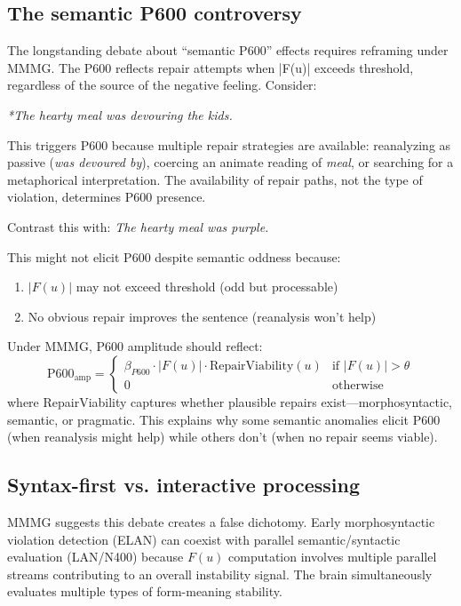 \documentclass[12pt,letterpaper]{article}
\begin{document}
\subsection{The semantic P600 controversy}
The longstanding debate about \enquote{semantic P600} effects \autocite{Kuperberg2007} requires reframing under MMMG. The P600 reflects repair attempts when |F(u)| exceeds threshold, regardless of the source of the negative feeling. Consider:

\ea
\textit{*The hearty meal was devouring the kids.}
\z

This triggers P600 because multiple repair strategies are available: reanalyzing as passive (\textit{was devoured by}), coercing an animate reading of \textit{meal}, or searching for a metaphorical interpretation. The availability of repair paths, not the type of violation, determines P600 presence.

Contrast this with:
\ea
\textit{The hearty meal was purple.}
\z

This might not elicit P600 despite semantic oddness because:
\begin{enumerate}
    \item $|F(u)|$ may not exceed threshold (odd but processable)
    \item No obvious repair improves the sentence (reanalysis won't help)
\end{enumerate}

Under MMMG, P600 amplitude should reflect:
\[
\text{P600}_{\text{amp}} = \begin{cases}
\beta_{P600} \cdot |F(u)| \cdot \text{RepairViability}(u) & \text{if } |F(u)| > \theta \\
0 & \text{otherwise}
\end{cases}
\]
where RepairViability captures whether plausible repairs exist—morphosyntactic, semantic, or pragmatic. This explains why some semantic anomalies elicit P600 (when reanalysis might help) while others don't (when no repair seems viable).

\subsection{Syntax-first vs. interactive processing}
MMMG suggests this debate creates a false dichotomy. Early morphosyntactic violation detection (ELAN) can coexist with parallel semantic/syntactic evaluation (LAN/N400) because $F(u)$ computation involves multiple parallel streams contributing to an overall instability signal. The brain simultaneously evaluates multiple types of form-meaning stability.
\end{document}
